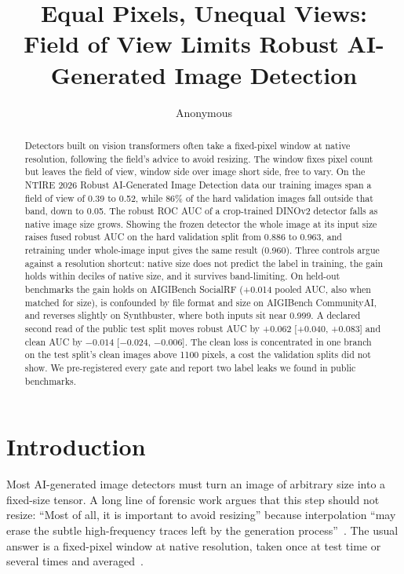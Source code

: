 \documentclass[10pt,twocolumn,letterpaper]{article}
\title{Equal Pixels, Unequal Views:\\Field of View Limits Robust AI-Generated Image Detection}
\author{Anonymous}
\begin{document}
\maketitle

\begin{abstract}
Detectors built on vision transformers often take a fixed-pixel window at
native resolution, following the field's advice to avoid resizing. The window
fixes pixel count but leaves the field of view, window side over image short
side, free to vary. On the NTIRE 2026 Robust AI-Generated Image Detection data
our training images span a field of view of 0.39 to 0.52, while 86\% of the
hard validation images fall outside that band, down to 0.05. The robust ROC
AUC of a crop-trained DINOv2 detector falls as native image size grows.
Showing the frozen detector the whole image at its input size raises fused
robust AUC on the hard validation split from 0.886 to 0.963, and retraining
under whole-image input gives the same result (0.960). Three controls argue
against a resolution shortcut: native size does not predict the label in
training, the gain holds within deciles of native size, and it survives
band-limiting. On held-out benchmarks the gain holds on AIGIBench SocialRF
(+0.014 pooled AUC, also when matched for size), is confounded by file format
and size on AIGIBench CommunityAI, and reverses slightly on Synthbuster, where
both inputs sit near 0.999. A declared second read of the public test split
moves robust AUC by +0.062 [+0.040, +0.083] and clean AUC by $-0.014$
[$-0.024$, $-0.006$]. The clean loss is concentrated in one branch on the
test split's clean images above 1100 pixels, a cost the validation splits did
not show. We pre-registered every gate and report two label leaks we found in
public benchmarks.
\end{abstract}

\section{Introduction}
\label{sec:intro}

Most AI-generated image detectors must turn an image of arbitrary size into a
fixed-size tensor. A long line of forensic work argues that this step should
not resize: ``Most of all, it is important to avoid resizing'' because
interpolation ``may erase the subtle high-frequency traces left by the
generation process''~\cite{corvi2023detection}. The usual answer is a
fixed-pixel window at native resolution, taken once at test time or several
times and averaged~\cite{corvi2023detection,li2025safe,guillaro2025bfree,konstantinidou2025texturecrop}.
\end{document}

